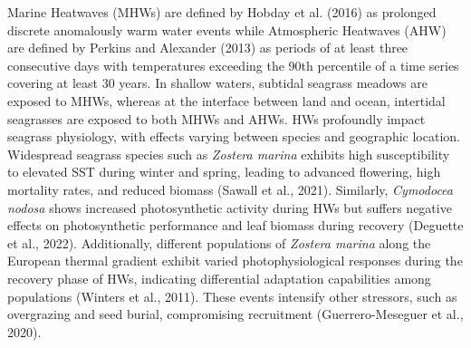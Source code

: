 \documentclass[
  letterpaper,
  11pt,
  english,
  singlespacing,
  headsepline]{MastersDoctoralThesis}
\begin{document}
\begin{spacing}{1.5}
Marine Heatwaves (MHWs) are defined by Hobday et al. (2016) as prolonged
discrete anomalously warm water events while Atmospheric Heatwaves (AHW)
are defined by Perkins and Alexander (2013) as periods of at least three
consecutive days with temperatures exceeding the 90th percentile of a
time series covering at least 30 years. In shallow waters, subtidal
seagrass meadows are exposed to MHWs, whereas at the interface between
land and ocean, intertidal seagrasses are exposed to both MHWs and AHWs.
HWs profoundly impact seagrass physiology, with effects varying between
species and geographic location. Widespread seagrass species such as
\emph{Zostera marina} exhibits high susceptibility to elevated SST
during winter and spring, leading to advanced flowering, high mortality
rates, and reduced biomass (Sawall et al., 2021). Similarly,
\emph{Cymodocea nodosa} shows increased photosynthetic activity during
HWs but suffers negative effects on photosynthetic performance and leaf
biomass during recovery (Deguette et al., 2022). Additionally, different
populations of \emph{Zostera marina} along the European thermal gradient
exhibit varied photophysiological responses during the recovery phase of
HWs, indicating differential adaptation capabilities among populations
(Winters et al., 2011). These events intensify other stressors, such as
overgrazing and seed burial, compromising recruitment (Guerrero-Meseguer
et al., 2020).


\end{spacing}
\end{document}
